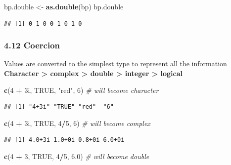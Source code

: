 \documentclass[]{article}
\newenvironment{Shaded}{\begin{snugshade}}{\end{snugshade}}
\newcommand{\KeywordTok}[1]{\textcolor[rgb]{0.13,0.29,0.53}{\textbf{#1}}}
\newcommand{\DecValTok}[1]{\textcolor[rgb]{0.00,0.00,0.81}{#1}}
\newcommand{\FloatTok}[1]{\textcolor[rgb]{0.00,0.00,0.81}{#1}}
\newcommand{\StringTok}[1]{\textcolor[rgb]{0.31,0.60,0.02}{#1}}
\newcommand{\CommentTok}[1]{\textcolor[rgb]{0.56,0.35,0.01}{\textit{#1}}}
\newcommand{\OtherTok}[1]{\textcolor[rgb]{0.56,0.35,0.01}{#1}}
\newcommand{\OperatorTok}[1]{\textcolor[rgb]{0.81,0.36,0.00}{\textbf{#1}}}
\newcommand{\NormalTok}[1]{#1}
\begin{document}
\begin{Shaded}
\begin{Highlighting}[]
\NormalTok{bp.double <-}\StringTok{ }\KeywordTok{as.double}\NormalTok{(bp)}
\NormalTok{bp.double}
\end{Highlighting}
\end{Shaded}

\begin{verbatim}
## [1] 0 1 0 0 1 0 1 0
\end{verbatim}

\subsubsection{4.12 Coercion}\label{coercion}

Values are converted to the simplest type to represent all the
information \textbf{Character \textgreater{} complex \textgreater{}
double \textgreater{} integer \textgreater{} logical}

\begin{Shaded}
\begin{Highlighting}[]
\KeywordTok{c}\NormalTok{(}\DecValTok{4} \OperatorTok{+}\StringTok{ }\NormalTok{3i, }\OtherTok{TRUE}\NormalTok{, }\StringTok{"red"}\NormalTok{, }\DecValTok{6}\NormalTok{) }\CommentTok{# will become character}
\end{Highlighting}
\end{Shaded}

\begin{verbatim}
## [1] "4+3i" "TRUE" "red"  "6"
\end{verbatim}

\begin{Shaded}
\begin{Highlighting}[]
\KeywordTok{c}\NormalTok{(}\DecValTok{4} \OperatorTok{+}\StringTok{ }\NormalTok{3i, }\OtherTok{TRUE}\NormalTok{, }\DecValTok{4}\OperatorTok{/}\DecValTok{5}\NormalTok{, }\DecValTok{6}\NormalTok{) }\CommentTok{# will become complex}
\end{Highlighting}
\end{Shaded}

\begin{verbatim}
## [1] 4.0+3i 1.0+0i 0.8+0i 6.0+0i
\end{verbatim}

\begin{Shaded}
\begin{Highlighting}[]
\KeywordTok{c}\NormalTok{(}\DecValTok{4} \OperatorTok{+}\StringTok{ }\DecValTok{3}\NormalTok{, }\OtherTok{TRUE}\NormalTok{, }\DecValTok{4}\OperatorTok{/}\DecValTok{5}\NormalTok{, }\FloatTok{6.0}\NormalTok{) }\CommentTok{# will become double}
\end{Highlighting}
\end{Shaded}
\end{document}
